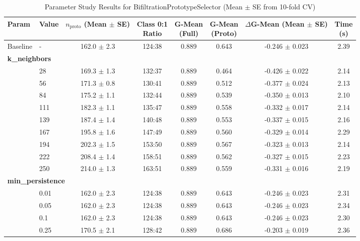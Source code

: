\begin{table}[htbp]
\centering
\caption{Parameter Study Results for BifiltrationPrototypeSelector (Mean $\pm$ SE from 10-fold CV)}
\label{tab:parameter_study}
\small
\begin{tabular}{llcccccc}
\hline
Param & Value & \makecell{$n_{\text{proto}}$ \\ (Mean $\pm$ SE)} & \makecell{Class 0:1 \\ Ratio} & \makecell{G-Mean \\ (Full)} & \makecell{G-Mean \\ (Proto)} & \makecell{$\Delta$G-Mean \\ (Mean $\pm$ SE)} & \makecell{Time \\ (s)} \\
\hline
Baseline & - & 162.0 $\pm$ 2.3 & 124:38 & 0.889 & 0.643 & -0.246 $\pm$ 0.023 & 2.39 \\
\hline
\multicolumn{8}{l}{\textbf{k\_neighbors}} \\
  & 28 & 169.3 $\pm$ 1.3 & 132:37 & 0.889 & 0.464 & -0.426 $\pm$ 0.022 & 2.14 \\
  & 56 & 171.3 $\pm$ 0.8 & 130:41 & 0.889 & 0.512 & -0.377 $\pm$ 0.024 & 2.13 \\
  & 84 & 175.2 $\pm$ 1.1 & 132:44 & 0.889 & 0.539 & -0.350 $\pm$ 0.013 & 2.10 \\
  & 111 & 182.3 $\pm$ 1.1 & 135:47 & 0.889 & 0.558 & -0.332 $\pm$ 0.017 & 2.14 \\
  & 139 & 187.4 $\pm$ 1.4 & 140:48 & 0.889 & 0.553 & -0.337 $\pm$ 0.015 & 2.16 \\
  & 167 & 195.8 $\pm$ 1.6 & 147:49 & 0.889 & 0.560 & -0.329 $\pm$ 0.014 & 2.29 \\
  & 194 & 202.3 $\pm$ 1.5 & 153:50 & 0.889 & 0.567 & -0.323 $\pm$ 0.013 & 2.14 \\
  & 222 & 208.4 $\pm$ 1.4 & 158:51 & 0.889 & 0.562 & -0.327 $\pm$ 0.015 & 2.23 \\
  & 250 & 214.0 $\pm$ 1.3 & 163:51 & 0.889 & 0.559 & -0.331 $\pm$ 0.016 & 2.19 \\
\hline
\multicolumn{8}{l}{\textbf{min\_persistence}} \\
  & 0.01 & 162.0 $\pm$ 2.3 & 124:38 & 0.889 & 0.643 & -0.246 $\pm$ 0.023 & 2.31 \\
  & 0.05 & 162.0 $\pm$ 2.3 & 124:38 & 0.889 & 0.643 & -0.246 $\pm$ 0.023 & 2.34 \\
  & 0.1 & 162.0 $\pm$ 2.3 & 124:38 & 0.889 & 0.643 & -0.246 $\pm$ 0.023 & 2.30 \\
  & 0.25 & 170.5 $\pm$ 2.1 & 128:42 & 0.889 & 0.686 & -0.203 $\pm$ 0.019 & 2.36 \\

\end{tabular}
\end{table}
